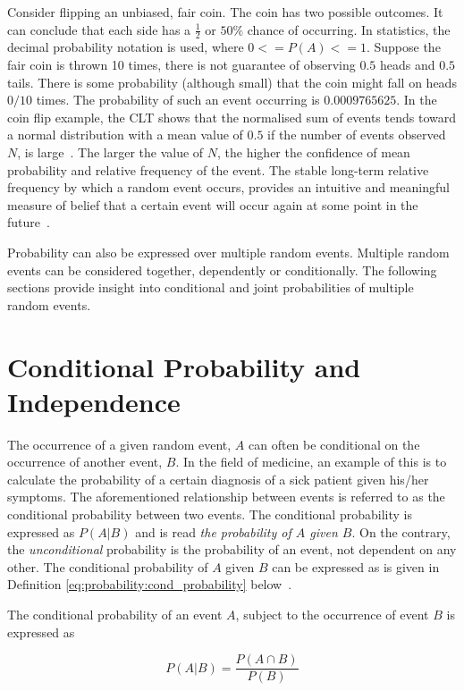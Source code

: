 Consider flipping an unbiased, fair coin. The coin has two possible outcomes. It can conclude that each side has a $\frac{1}{2}$ or $50\%$ chance of occurring. In statistics, the decimal probability notation is used, where $0 <= P(A) <= 1$. Suppose the fair coin is thrown 10 times, there is not guarantee of observing $0.5$ heads and $0.5$ tails. There is some probability (although small) that the coin might fall on heads $0/10$ times. The probability of such an event occurring is $0.0009765625$. In the coin flip example, the \acf{CLT} shows that the normalised sum of events tends toward a normal distribution with a mean value of $0.5$ if the number of events observed $N$, is large~\cite{ref:wackerly:2014}. The larger the value of $N$, the higher the confidence of mean probability and relative frequency of the event. The stable long-term relative frequency by which a random event occurs, provides an intuitive and meaningful measure of belief that a certain event will occur again at some point in the future~\cite{ref:wackerly:2014}.

Probability can also be expressed over multiple random events. Multiple random events can be considered together, dependently or conditionally. The following sections provide insight into conditional and joint probabilities of multiple random events.

\section{Conditional Probability and Independence}\label{sec:probability:cond_probability}

The occurrence of a given random event, $A$ can often be conditional on the occurrence of another event, $B$. In the field of medicine, an example of this is to calculate the probability of a certain diagnosis of a sick patient given his/her symptoms. The aforementioned relationship between events is referred to as the conditional probability between two events. The conditional probability is expressed as $P(A \vert B)$ and is read \textit{the probability of $A$ given $B$}. On the contrary, the \textit{unconditional} probability is the probability of an event, not dependent on any other. The conditional probability of $A$ given $B$ can be expressed as is given in Definition \ref{eq:probability:cond_probability} below~\cite{ref:wackerly:2014}.
\\
\begin{definition}
      \label{eq:probability:cond_probability}
      The conditional probability of an event $A$, subject to the occurrence of event $B$ is expressed as

      \begin{equation}
            \label{eq:probability:overview:conditional}
            P(A \vert B) = \frac{P(A \cap B)}{P(B)}
      \end{equation}
\end{definition}

